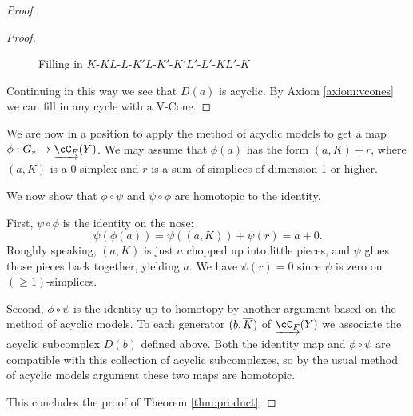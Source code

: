 \begin{proof}
\begin{proof}
\begin{figure}[t] \centering
{}
\caption{Filling in $K$-$KL$-$L$-$K'L$-$K'$-$K'L'$-$L'$-$KL'$-$K$}
\label{zzz5}
\end{figure}

Continuing in this way we see that $D(a)$ is acyclic.
By Axiom \ref{axiom:vcones} we can fill in any cycle with a V-Cone.
\end{proof}

We are now in a position to apply the method of acyclic models to get a map
$\phi:G_* \to \cl{\cC_F}(Y)$.
We may assume that $\phi(a)$ has the form $(a, K) + r$, where $(a, K)$ is a 0-simplex
and $r$ is a sum of simplices of dimension 1 or higher.

We now show that $\phi\circ\psi$ and $\psi\circ\phi$ are homotopic to the identity.

First, $\psi\circ\phi$ is the identity on the nose:
\[
	\psi(\phi(a)) = \psi((a,K)) + \psi(r) = a + 0.
\]
Roughly speaking, $(a, K)$ is just $a$ chopped up into little pieces, and 
$\psi$ glues those pieces back together, yielding $a$.
We have $\psi(r) = 0$ since $\psi$ is zero on $(\ge 1)$-simplices.
 
Second, $\phi\circ\psi$ is the identity up to homotopy by another argument based on the method of acyclic models.
To each generator $(b, \overline{K})$ of $\cl{\cC_F}(Y)$ we associate the acyclic subcomplex $D(b)$ defined above.
Both the identity map and $\phi\circ\psi$ are compatible with this
collection of acyclic subcomplexes, so by the usual method of acyclic models argument these two maps
are homotopic.

This concludes the proof of Theorem \ref{thm:product}.
\end{proof}

